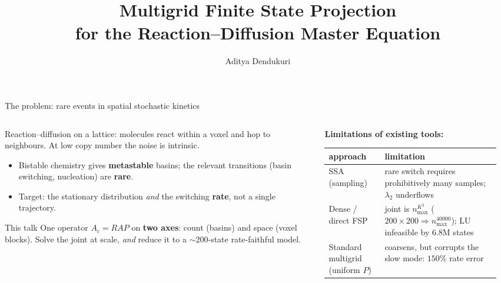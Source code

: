 \documentclass[10pt,aspectratio=169]{beamer}
\title[Multigrid FSP for the RDME]{%
  Multigrid Finite State Projection\\
  for the Reaction--Diffusion Master Equation}
\author{Aditya Dendukuri}
\institute[UCSB]{University of California, Santa Barbara}
\date{}
\begin{document}
\begin{frame}\titlepage\end{frame}


\begin{frame}{The problem: rare events in spatial stochastic kinetics}

  \begin{columns}[T]
    \begin{column}{0.48\textwidth}
      Reaction--diffusion on a lattice: molecules react within a voxel and hop to
      neighbours. At low copy number the noise is intrinsic.
      \begin{itemize}\setlength\itemsep{0.35em}
        \item Bistable chemistry gives \textbf{metastable} basins; the relevant
              transitions (basin switching, nucleation) are \textbf{rare}.
        \item Target: the stationary distribution \emph{and} the switching
              \textbf{rate}, not a single trajectory.
      \end{itemize}

      \medskip
      \begin{block}{This talk}\small
        One operator $A_c=RAP$ on \textbf{two axes}: count (basins) and space
        (voxel blocks). Solve the joint at scale, \emph{and} reduce it to a
        $\sim$200-state rate-faithful model.
      \end{block}
    \end{column}
    \begin{column}{0.48\textwidth}
      \footnotesize
      \textbf{Limitations of existing tools:}
      \smallskip

      \begin{tabular}{@{}p{0.30\linewidth}p{0.62\linewidth}@{}}
        \toprule
        \textbf{approach} & \textbf{limitation} \\
        \midrule
        SSA (sampling) & rare switch requires prohibitively many samples;
                         $\lambda_2$ underflows \\[0.35em]
        Dense / direct FSP & joint is $n_{\max}^{K^2}$
                         ($200{\times}200\Rightarrow n_{\max}^{40000}$);
                         LU infeasible by 6.8M states \\[0.35em]
        Standard multigrid (uniform $P$) & coarsens, but corrupts the slow mode:
                         $150\%$ rate error \\
        \bottomrule
      \end{tabular}
    \end{column}
  \end{columns}
\end{frame}
\end{document}
